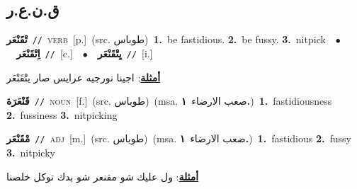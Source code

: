 \documentclass[10pt,a4paper,twoside]{article} %
\begin{document}
\begin{multicols}{2}
\vspace{-3mm}
\subsection*{\color{blue}\foreignlanguage{arabic}{ق.ن.ع.ر}\color{blue}{}} 

{\setlength\topsep{0pt}\textbf{\foreignlanguage{arabic}{تْقَنْعَر}}\ {\color{gray}\texttt{//}\color{black}}\ \textsc{verb}\ [p.]\ (src. \color{gray}\foreignlanguage{arabic}{طوباس}\color{black})\ \textbf{1.}~be fastidious.  \textbf{2.}~be fussy.  \textbf{3.}~nitpick\ \ $\bullet$\ \ \setlength\topsep{0pt}\textbf{\foreignlanguage{arabic}{اِتْقَنْعَر}}\ {\color{gray}\texttt{//}\color{black}}\ [c.]\ \ $\bullet$\ \ \setlength\topsep{0pt}\textbf{\foreignlanguage{arabic}{يِتْقَنْعَر}}\ {\color{gray}\texttt{//}\color{black}}\ [i.]\  \begin{flushright}\color{gray}\foreignlanguage{arabic}{\textbf{\underline{\foreignlanguage{arabic}{أمثلة}}}: اجينا نورجيه عرايس صار يتْقَنْعَر}\end{flushright}\color{black}} \vspace{2mm}

{\setlength\topsep{0pt}\textbf{\foreignlanguage{arabic}{قَنْعَرَة}}\ {\color{gray}\texttt{//}\color{black}}\ \textsc{noun}\ [f.]\ (src. \color{gray}\foreignlanguage{arabic}{طوباس}\color{black})\ \color{gray}(msa. \foreignlanguage{arabic}{صعب الارضاء}~\foreignlanguage{arabic}{\textbf{١.}})\color{black}\ \textbf{1.}~fastidiousness  \textbf{2.}~fussiness  \textbf{3.}~nitpicking\ } \vspace{2mm}

{\setlength\topsep{0pt}\textbf{\foreignlanguage{arabic}{مْقَنْعَر}}\ {\color{gray}\texttt{//}\color{black}}\ \textsc{adj}\ [m.]\ (src. \color{gray}\foreignlanguage{arabic}{طوباس}\color{black})\ \color{gray}(msa. \foreignlanguage{arabic}{صعب الارضاء}~\foreignlanguage{arabic}{\textbf{١.}})\color{black}\ \textbf{1.}~fastidious  \textbf{2.}~fussy  \textbf{3.}~nitpicky\  \begin{flushright}\color{gray}\foreignlanguage{arabic}{\textbf{\underline{\foreignlanguage{arabic}{أمثلة}}}: ول عليك شو مقنعر شو بدك توكل خلصنا}\end{flushright}\color{black}} \vspace{2mm}


\end{multicols}
\end{document}
